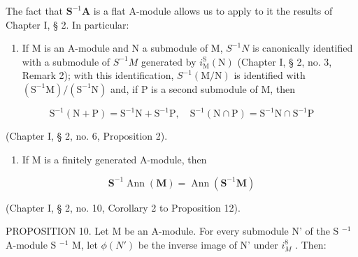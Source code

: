 The fact that \(\mathbf{S}^{-1}\mathbf{A}\) is a flat A-module allows us to apply to it the results of Chapter I, § 2. In particular:

\begin{enumerate}
\def\labelenumi{(\arabic{enumi})}
\tightlist
\item
  If M is an A-module and N a submodule of M, \(S^{-1}N\) is canonically identified with a submodule of \(S^{-1}M\) generated by \(i_{\mathrm{M}}^{\mathrm{S}}(\mathrm{N})\) (Chapter I, § 2, no. 3, Remark 2); with this identification, \(S^{-1}(\mathrm{M}/\mathrm{N})\) is identified with \((\mathrm{S}^{-1}\mathrm{M})/(\mathrm{S}^{-1}\mathrm{N})\) and, if P is a second submodule of M, then
\end{enumerate}

\[
\mathrm{S} ^ {- 1} (\mathrm{N} + \mathrm{P}) = \mathrm{S} ^ {- 1} \mathrm{N} + \mathrm{S} ^ {- 1} \mathrm{P}, \quad \mathrm{S} ^ {- 1} (\mathrm{N} \cap \mathrm{P}) = \mathrm{S} ^ {- 1} \mathrm{N} \cap \mathrm{S} ^ {- 1} \mathrm{P}
\]

(Chapter I, § 2, no. 6, Proposition 2).

\begin{enumerate}
\def\labelenumi{(\arabic{enumi})}
\setcounter{enumi}{1}
\tightlist
\item
  If M is a finitely generated A-module, then
\end{enumerate}

\[
\mathbf {S} ^ {- 1} \operatorname{Ann} (\mathbf {M}) = \operatorname{Ann} (\mathbf {S} ^ {- 1} \mathbf {M})\tag{9}
\]

(Chapter I, § 2, no. 10, Corollary 2 to Proposition 12).

PROPOSITION 10. Let M be an A-module. For every submodule N' of the S \(^{-1}\) A-module S \(^{-1}\) M, let \(\phi(N')\) be the inverse image of N' under \(i_{M}^{8}\) . Then:


